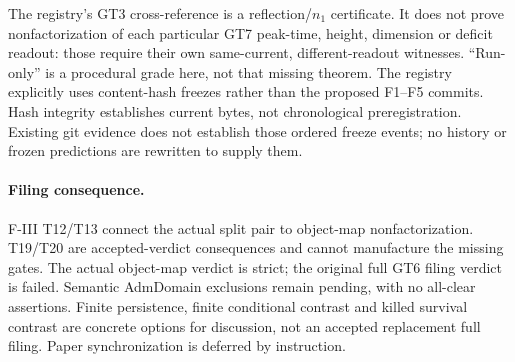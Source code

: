 \documentclass{article}
\begin{document}
The registry's GT3 cross-reference is a reflection/$n_1$ certificate. It does
not prove nonfactorization of each particular GT7 peak-time, height, dimension
or deficit readout: those require their own same-current, different-readout
witnesses. ``Run-only'' is a procedural grade here, not that missing theorem.
The registry explicitly uses content-hash freezes rather than the proposed
F1--F5 commits. Hash integrity establishes current bytes, not chronological
preregistration. Existing git evidence does not establish those ordered
freeze events; no history or frozen predictions are rewritten to supply them.

\paragraph{Filing consequence.}
F-III T12/T13 connect the actual split pair to object-map nonfactorization.
T19/T20 are accepted-verdict consequences and cannot manufacture the missing
gates. The actual object-map verdict is strict; the original full GT6 filing
verdict is failed. Semantic AdmDomain exclusions remain pending, with no
all-clear assertions. Finite persistence, finite conditional contrast and
killed survival contrast are concrete options for discussion, not an accepted
replacement full filing. Paper synchronization is deferred by instruction.
\end{document}
